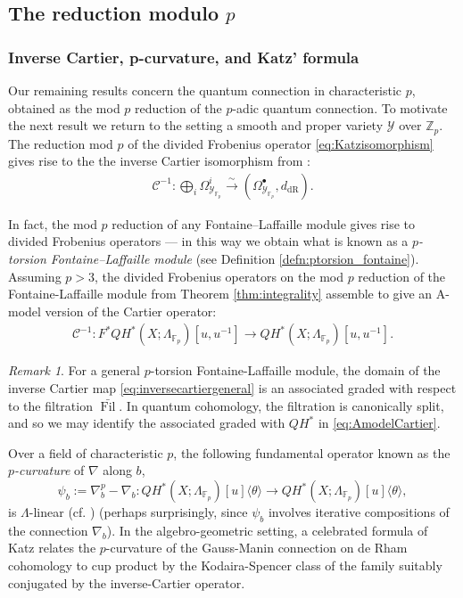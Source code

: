 \documentclass[reqno]{amsart}
\numberwithin{equation}{section}
\numberwithin{equation}{section}
\numberwithin{equation}{section}
\theoremstyle{definition}
\theoremstyle{remark}
\theoremstyle{remark}
\newtheorem{rem}[thm]{Remark}
\begin{document}
\subsection{The reduction modulo $p$}

\subsubsection{Inverse Cartier, p-curvature, and Katz' formula}
Our remaining results concern the quantum connection in characteristic $p$, obtained as the mod $p$ reduction of the $p$-adic quantum connection. To motivate the next result we return to the setting a smooth and proper variety $\mathcal{Y}$ over $\mathbb{Z}_p$. The reduction mod $p$ of the divided Frobenius operator \eqref{eq:Katzisomorphism} gives rise to the the inverse Cartier isomorphism from \cite{deligneillusie}:  \begin{align} \label{eq:Cartierisomorphism}
\mathcal{C}^{-1}:\bigoplus_i\Omega^i_{\mathcal{Y}_{\mathbb{F}_p}} \xrightarrow{\sim} (\Omega^\bullet_{\mathcal{Y}_{\mathbb{F}_p}}, d_{\mathrm{dR}}).
\end{align} 

In fact, the mod $p$ reduction of any Fontaine--Laffaille module gives rise to divided Frobenius operators --- in this way we obtain what is known as a \emph{$p$-torsion Fontaine--Laffaille module} (see Definition \ref{defn:ptorsion_fontaine}). Assuming $p>3$, the divided Frobenius operators on the mod $p$ reduction of the Fontaine-Laffaille module from Theorem \ref{thm:integrality} assemble to give an A-model version of the Cartier operator:
\begin{align} \label{eq:AmodelCartier} \mathcal{C}^{-1}: F^*QH^*(X;\Lambda_{\mathbb{F}_p})[u,u^{-1}] \to QH^*(X;\Lambda_{\mathbb{F}_p})[u,u^{-1}]. \end{align}

\begin{rem} For a general $p$-torsion Fontaine-Laffaille module, the domain of the inverse Cartier map \eqref{eq:inversecartiergeneral} is an associated graded with respect to the filtration $\bar{\operatorname{Fil}}$. In quantum cohomology, the filtration is canonically split, and so we may identify the associated graded with $QH^*$ in \eqref{eq:AmodelCartier}.  \end{rem}

Over a field of characteristic $p$, the following fundamental operator known as the \emph{$p$-curvature} of $\nabla$ along $b$, 
\begin{equation}
        \psi_b := \nabla_b^p - \nabla_b : QH^*(X;\Lambda_{\mathbb{F}_p})[u]\langle \theta \rangle \to QH^*(X;\Lambda_{\mathbb{F}_p})[u]\langle \theta \rangle,
\end{equation}
is $\Lambda$-linear (cf. \cite[Section 5]{Kat70}) (perhaps surprisingly, since $\psi_b$ involves iterative compositions of the connection $\nabla_b$). In the algebro-geometric setting, a celebrated formula of Katz \cite[Theorem 3.2]{Kat72} relates the $p$-curvature of the Gauss-Manin connection on de Rham cohomology to cup product by the Kodaira-Spencer class of the family suitably conjugated by the inverse-Cartier operator. 
\end{document}
